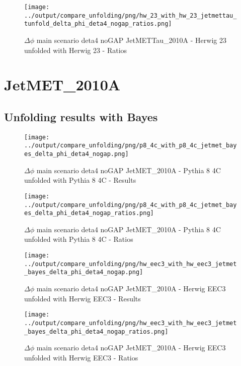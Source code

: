 \documentclass[11pt]{book}
\begin{document}
\begin{figure}[ht]
\centering
\texttt{[image: ../output/compare\_unfolding/png/hw\_23\_with\_hw\_23\_jetmettau\_tunfold\_delta\_phi\_deta4\_nogap\_ratios.png]}
\caption{$\Delta\phi$ main scenario deta4 noGAP JetMETTau\_2010A - Herwig 23 unfolded with Herwig 23 - Ratios}
\label{hw_23_hw_23_jetmettau_tunfold_delta_phi_deta4_nogap_b}
\end{figure}


\clearpage
\section{JetMET\_2010A}
\subsection{Unfolding results with Bayes}

\begin{figure}[ht]
\centering
\texttt{[image: ../output/compare\_unfolding/png/p8\_4c\_with\_p8\_4c\_jetmet\_bayes\_delta\_phi\_deta4\_nogap.png]}
\caption{$\Delta\phi$ main scenario deta4 noGAP JetMET\_2010A - Pythia 8 4C unfolded with Pythia 8 4C - Results}
\label{p8_p8_jetmet_bayes_delta_phi_deta4_nogap_a}
\end{figure}

\begin{figure}[ht]
\centering
\texttt{[image: ../output/compare\_unfolding/png/p8\_4c\_with\_p8\_4c\_jetmet\_bayes\_delta\_phi\_deta4\_nogap\_ratios.png]}
\caption{$\Delta\phi$ main scenario deta4 noGAP JetMET\_2010A - Pythia 8 4C unfolded with Pythia 8 4C - Ratios}
\label{p8_p8_jetmet_bayes_delta_phi_deta4_nogap_b}
\end{figure}

\begin{figure}[ht]
\centering
\texttt{[image: ../output/compare\_unfolding/png/hw\_eec3\_with\_hw\_eec3\_jetmet\_bayes\_delta\_phi\_deta4\_nogap.png]}
\caption{$\Delta\phi$ main scenario deta4 noGAP JetMET\_2010A - Herwig EEC3 unfolded with Herwig EEC3 - Results}
\label{hw_eec3_hw_eec3_jetmet_bayes_delta_phi_deta4_nogap_a}
\end{figure}

\begin{figure}[ht]
\centering
\texttt{[image: ../output/compare\_unfolding/png/hw\_eec3\_with\_hw\_eec3\_jetmet\_bayes\_delta\_phi\_deta4\_nogap\_ratios.png]}
\caption{$\Delta\phi$ main scenario deta4 noGAP JetMET\_2010A - Herwig EEC3 unfolded with Herwig EEC3 - Ratios}
\label{hw_eec3_hw_eec3_jetmet_bayes_delta_phi_deta4_nogap_b}
\end{figure}
\end{document}
